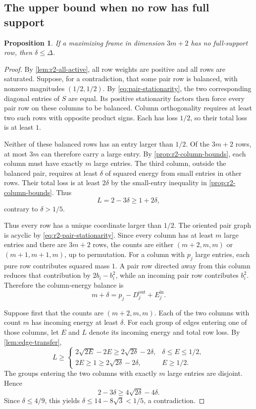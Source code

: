 \documentclass[11pt]{article}
\numberwithin{equation}{section}
\newtheorem{proposition}[proposition]{Proposition}
\theoremstyle{definition}
\theoremstyle{definition}
\begin{document}
\subsection{The upper bound when no row has full support}

\begin{proposition}\label{prop:r2-no-full}
If a maximizing frame in dimension $3m+2$ has no full-support
row, then $\delta\le\Delta$.
\end{proposition}

\begin{proof}
By \cref{lem:r2-all-active}, all row weights are positive and all
rows are saturated.  Suppose, for a contradiction, that some pair row is balanced,
with nonzero magnitudes $(1/2,1/2)$.  By \eqref{eq:pair-stationarity}, the two corresponding
diagonal entries of $S$ are equal.  Its positive stationarity factors
then force every pair row on these columns to be balanced.
Column orthogonality requires at least two such rows with opposite
product signs.  Each has loss $1/2$, so their total loss is at least
$1$.

Neither of these balanced rows has an entry larger than $1/2$.
Of the $3m+2$ rows, at most $3m$ can therefore carry a large entry.
By \cref{prop:r2-column-bounds}, each column must have exactly $m$
large entries.  The third column, outside the balanced pair,
requires at least $\delta$ of squared energy from small entries
in other rows.  Their total loss is at least $2\delta$ by the
small-entry inequality in \cref{prop:r2-column-bounds}.
Thus
\[
 L=2-3\delta\ge1+2\delta,
\]
contrary to $\delta>1/5$.

Thus every row has a unique coordinate larger than $1/2$.
The oriented pair graph is acyclic by
\eqref{eq:r2-pair-stationarity}.  Since every column has at least
$m$ large entries and there are $3m+2$ rows, the counts are either
$(m+2,m,m)$ or $(m+1,m+1,m)$, up to permutation.
For a column with $p_j$ large entries, each pure row contributes
squared mass $1$. A pair row directed away from this column
reduces that contribution by $2b_i-b_i^2$, while an incoming
pair row contributes $b_i^2$. Therefore the column-energy balance is
\begin{equation}
 m+\delta=p_j-D_j^{\mathrm{out}}+E_j^{\mathrm{in}}.
 \label{eq:r2-vertex-balance}
\end{equation}

Suppose first that the counts are $(m+2,m,m)$.
Each of the two columns with count $m$ has incoming energy
at least $\delta$. For each group of edges entering one of those columns, let $E$
and $L$ denote its incoming energy and total row loss.  By \cref{lem:edge-transfer},
\[
 L\ge
 \begin{cases}
  2\sqrt{2E}-2E\ge2\sqrt{2\delta}-2\delta,&
      \delta\le E\le1/2,\\
  2E\ge1\ge2\sqrt{2\delta}-2\delta,&E\ge1/2.
 \end{cases}
\]
The groups entering the two columns with exactly $m$ large entries
are disjoint. Hence
\[
 2-3\delta\ge4\sqrt{2\delta}-4\delta.
\]
Since $\delta\le4/9$, this yields
$\delta\le14-8\sqrt3<1/5$, a contradiction.


\end{proof}
\end{document}
